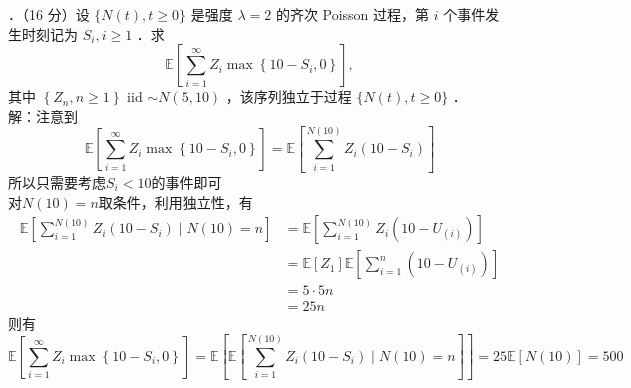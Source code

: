 \documentclass[UTF8]{ctexart}
\begin{document}
．（16 分）设 $\{N(t), t \geq 0\}$ 是强度 $\lambda=2$ 的齐次 Poisson 过程，第 $i$ 个事件发生时刻记为 $S_{i}, i \geq 1$ ．求
$$
\mathbb{E}\left[\sum_{i=1}^{\infty} Z_{i} \max \left\{10-S_{i}, 0\right\}\right],
$$
其中 $\left\{Z_{n}, n \geq 1\right\}$ iid $\sim N(5,10)$ ，该序列独立于过程 $\{N(t), t \geq 0\}$ ．\\
解：注意到
\[
\mathbb{E}\left[\sum_{i=1}^{\infty} Z_{i} \max \left\{10-S_{i}, 0\right\}\right]=\mathbb{E}\left[\sum_{i=1}^{N(10)} Z_{i}  (10-S_{i}) \right]
\]
所以只需要考虑$S_i<10$的事件即可\\
对$N(10)=n$取条件，利用独立性，有
\begin{align*}
	\mathbb{E}\left[\sum_{i=1}^{N(10)} Z_{i}  (10-S_{i})\mid N(10)=n \right] & =\mathbb{E}\left[\sum_{i=1}^{N(10)} Z_{i}  (10-U_{(i)}) \right] \\
	& = \mathbb{E}[Z_1] \mathbb{E}\left[ \sum_{i=1}^n (10-U_{(i)})\right] \\
	&=5\cdot 5n\\
	&=25n
\end{align*}
则有
\[
\mathbb{E}\left[\sum_{i=1}^{\infty} Z_{i} \max \left\{10-S_{i}, 0\right\}\right]=\mathbb{E}\left[\mathbb{E}\left[\sum_{i=1}^{N(10)} Z_{i}  (10-S_{i})\mid N(10)=n \right] \right] =25\mathbb{E}[N(10)]=500
\]\\
\end{document}
